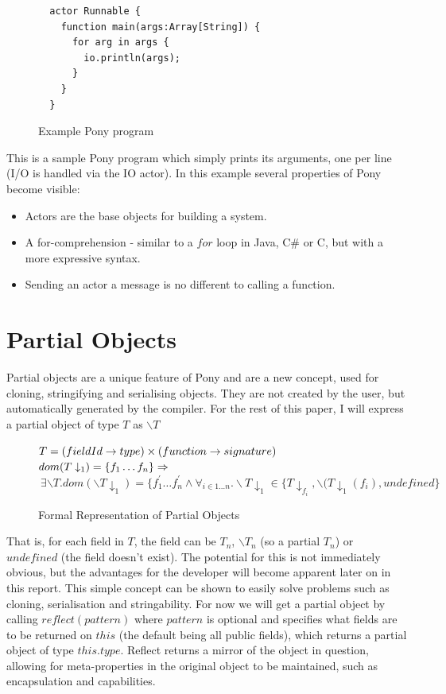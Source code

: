 \documentclass[pdftex,11pt,a4paper]{report}
\begin{document}
\begin{figure}[H]
\begin{verbatim}
  actor Runnable {
    function main(args:Array[String]) {
      for arg in args {
      	io.println(args);
      }
    }
  }
\end{verbatim}
\caption{Example Pony program}
\label{fig:simple}
\end{figure}

This is a sample Pony program which simply prints its arguments, one per line (I/O is handled via the IO actor).
In this example several properties of Pony become visible:
\begin{itemize}
\item Actors are the base objects for building a system.
\item A for-comprehension - similar to a $for$ loop in Java, C\# or C, but with
      a more expressive syntax.
\item Sending an actor a message is no different to calling a function.
\end{itemize}

\section{Partial Objects}

Partial objects are a unique feature of Pony and are a new concept, used for cloning, stringifying and serialising objects.
They are not created by the user, but automatically generated by the compiler.
For the rest of this paper, I will express a partial object of type $T$ as $\backslash T$

\begin{figure}[H]
$T = (fieldId \to type) \times (function \to signature)\\$
$dom(T\downarrow_{1}) = \{ f_{1} \dots f_{n} \} \Rightarrow\\$
$\> \exists \backslash T.dom(\backslash T\downarrow_{1}) = \{f_{1}^{'}\dots f_{n}^{'}\wedge
\forall_{i\in 1\dots n}.\backslash T\downarrow_{1} \in \{T\downarrow_{f_{i}},
\backslash(T\downarrow_{1}(f_{i}), undefined\}$
\caption{Formal Representation of Partial Objects}
\end{figure}

That is, for each field in $T$, the field can be $T_{n}$, $\backslash T_{n}$ (so a partial $T_{n}$) or $undefined$ (the field doesn't exist).
The potential for this is not immediately obvious, but the advantages for the developer will become apparent later on in this report.
This simple concept can be shown to easily solve problems such as cloning, serialisation and stringability.
For now we will get a partial object by calling $reflect(pattern)$ where $pattern$ is optional and specifies what fields are to be returned on $this$ (the default being all public fields), which returns a partial object of type $this.type$.
Reflect returns a mirror\cite{mirror-paper} of the object in question, allowing for meta-properties in the original object to be maintained, such as encapsulation and capabilities.
\end{document}
